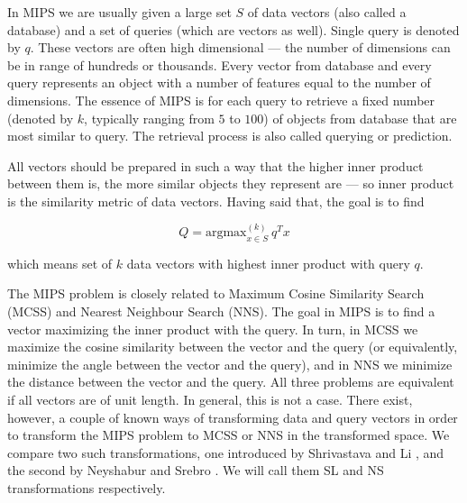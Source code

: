 In MIPS we are usually given a large set $S$ of data vectors (also called a database) and a set of queries
(which are vectors as well). Single query is denoted by $q$.
These vectors are often high dimensional --- the number of dimensions can be in range of hundreds or thousands.
Every vector from database and every query represents an object with a number of features equal to the number of dimensions.
The essence of MIPS is for each query to retrieve a fixed number (denoted by $k$, typically ranging
from $5$ to $100$)
of objects from database that are most similar to query.
The retrieval process is also called querying or prediction.

All vectors should be prepared in such a way that the higher inner product between them is, 
the more similar objects they represent are
 --- so inner product is the similarity metric of data vectors. 
Having said that, the goal is to find

$$ Q = \text{argmax}_{x \in S}^{(k)} \ q^T x $$

which means set of $k$ data vectors with highest inner product with query $q$.

The MIPS problem is closely related to Maximum Cosine
Similarity Search (MCSS) and Nearest Neighbour Search (NNS).
The goal in MIPS is to find a vector maximizing the inner product with the query. In turn, 
in MCSS we maximize the cosine similarity between the vector and the query (or equivalently,
minimize the angle between the vector and the query), and in NNS we minimize the distance between the vector and the query. All three problems are
equivalent if all vectors are of unit length. In general, this is not a case.
There exist, however, a couple of known ways
of transforming data and query vectors in order to transform the MIPS problem to MCSS or NNS in the transformed space. We compare two such 
transformations, one introduced by Shrivastava and Li \cite{alsh}, and the second by
Neyshabur and Srebro \cite{neyshabur}.
We will call them SL and NS transformations respectively.


